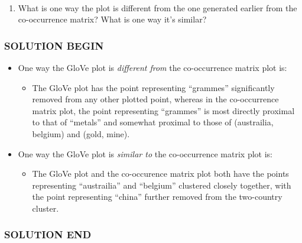 \documentclass[11pt]{article}
\providecommand{\tightlist}{%
      \setlength{\itemsep}{0pt}\setlength{\parskip}{0pt}}
\begin{document}
    \begin{center}
    \end{center}
    { \hspace*{\fill} \\}
    
    \begin{enumerate}
\def\labelenumi{\alph{enumi}.}
\tightlist
\item
  What is one way the plot is different from the one generated earlier
  from the co-occurrence matrix? What is one way it's similar?
\end{enumerate}

    \hypertarget{solution-begin}{%
\subsubsection{SOLUTION BEGIN}\label{solution-begin}}

\begin{itemize}
\tightlist
\item
  One way the GloVe plot is \emph{different from} the co-occurrence
  matrix plot is:

  \begin{itemize}
  \tightlist
  \item
    The GloVe plot has the point representing ``grammes'' significantly
    removed from any other plotted point, whereas in the co-occurrence
    matrix plot, the point representing ``grammes'' is most directly
    proximal to that of ``metals'' and somewhat proximal to those of
    (austrailia, belgium) and (gold, mine).
  \end{itemize}
\item
  One way the GloVe plot is \emph{similar to} the co-occurrence matrix
  plot is:

  \begin{itemize}
  \tightlist
  \item
    The GloVe plot and the co-occurence matrix plot both have the points
    representing ``austrailia'' and ``belgium'' clustered closely
    together, with the point representing ``china'' further removed from
    the two-country cluster.
  \end{itemize}
\end{itemize}

\hypertarget{solution-end}{%
\subsubsection{SOLUTION END}\label{solution-end}}
\end{document}
